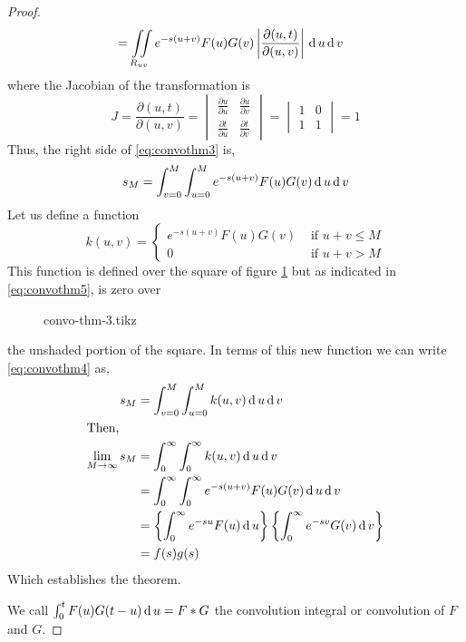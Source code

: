 \documentclass[../main-sheet.tex]{subfiles}
\begin{document}
\begin{proof}
\begin{align}
            & =\iint\limits_{R_{uv}} e^{-s(u+v)}F(u)G(v)\left\vert\frac{\partial (u,t)}{\partial (u,v)}\right\vert\,\mathrm{d}\, u\,\mathrm{d}\, v\label{eq:convothm3}
    \end{align}
    where the Jacobian of the transformation is
    \[
        J=\frac{\partial (u,t)}{\partial (u,v)}=\begin{vmatrix}
            \frac{\partial u}{\partial u} & \frac{\partial u}{\partial v} \\
            \frac{\partial t}{\partial u} & \frac{\partial t}{\partial v}
        \end{vmatrix}=\begin{vmatrix}
            1 & 0 \\
            1 & 1
        \end{vmatrix}=1
    \]
    Thus, the right side of \eqref{eq:convothm3} is,
    \begin{equation}
        s_M=\int_{v=0}^M\int_{u=0}^M e^{-s(u+v)}F(u)G(v)\,\mathrm{d}\, u\,\mathrm{d}\, v \label{eq:convothm4}
    \end{equation}
    Let us define a function
    \begin{equation}
        \label{eq:convothm5}
        k(u,v)=\begin{cases}
            e^{-s(u+v)}F(u)G(v) & \text{ if } u+v\leq M \\
            0                   & \text{ if } u+v> M
        \end{cases}
    \end{equation}
    This function is defined over the square of figure \ref{fig:convothm3} but as indicated in \eqref{eq:convothm5}, is zero over
    \begin{figure}[H]
        \centering
        {convo-thm-3.tikz}
        \caption{}
        \label{fig:convothm3}
    \end{figure}
    the unshaded portion of the square. In terms of this new function we can write \eqref{eq:convothm4} as,
    \begin{align*}
        s_M                    & =\int_{v=0}^M\int_{u=0}^M k(u,v)\,\mathrm{d}\, u\,\mathrm{d}\, v                                                           \\
        \intertext{Then,}
        \lim_{M\to \infty} s_M & =\int_{0}^\infty \int_{0}^\infty k(u,v)\,\mathrm{d}\, u\,\mathrm{d}\, v                                                    \\
                               & =\int_{0}^\infty \int_{0}^\infty e^{-s(u+v)}F(u)G(v) \,\mathrm{d}\, u\,\mathrm{d}\, v                                      \\
                               & =\left\{ \int_{0}^\infty e^{-su}F(u)\,\mathrm{d}\, u \right\}\left\{ \int_{0}^\infty e^{-sv}G(v) \,\mathrm{d}\, v \right\} \\
                               & =f(s) g(s)
    \end{align*}
    Which establishes the theorem.

    We call $ \int_0^t F(u)G(t-u)\,\mathrm{d}\, u=F*G $ the convolution integral or convolution of $ F $ and $ G $.
\end{proof}
\end{document}
